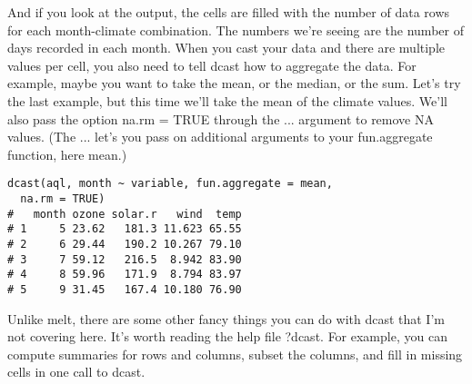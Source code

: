 \documentclass[french]{article}
\begin{document}
And if you look at the output, the cells are filled with the number of data rows for each month-climate combination. The numbers we’re seeing are the number of days recorded in each month. When you cast your data and there are multiple values per cell, you also need to tell dcast how to aggregate the data. For example, maybe you want to take the mean, or the median, or the sum. Let’s try the last example, but this time we’ll take the mean of the climate values. We’ll also pass the option na.rm = TRUE through the ... argument to remove NA values. (The ... let’s you pass on additional arguments to your fun.aggregate function, here mean.)
\begin{framed}
\begin{verbatim}
dcast(aql, month ~ variable, fun.aggregate = mean, 
  na.rm = TRUE)
#   month ozone solar.r   wind  temp
# 1     5 23.62   181.3 11.623 65.55
# 2     6 29.44   190.2 10.267 79.10
# 3     7 59.12   216.5  8.942 83.90
# 4     8 59.96   171.9  8.794 83.97
# 5     9 31.45   167.4 10.180 76.90
\end{verbatim}
\end{framed}
Unlike melt, there are some other fancy things you can do with dcast that I’m not covering here. It’s worth reading the help file ?dcast. For example, you can compute summaries for rows and columns, subset the columns, and fill in missing cells in one call to dcast.
\end{document}
